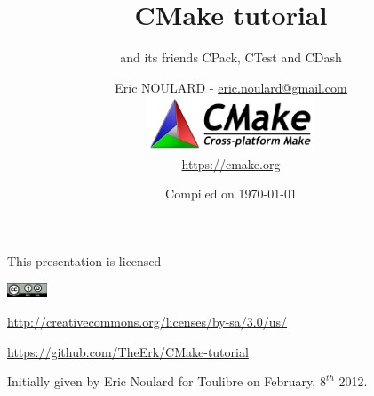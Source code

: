 \documentclass[compress,slidestop,table,usepdftitle=false
              ]
               {beamer}
\begin{document}


\title{CMake tutorial}
\subtitle{and its friends CPack, CTest and CDash}
\author[Eric NOULARD - \url{eric.noulard@gmail.com}]{Eric NOULARD - \url{eric.noulard@gmail.com}\\
        \includegraphics[width=5cm]{figures/CMake-logo-small}\\
        \url{https://cmake.org}}
\date{Compiled on \today}
\subject{Slides for CMake, CPack, CTest, CDash presentation. In english.}

\begin{frame}
\titlepage
\begin{center}
{\tiny
This presentation is licensed

\includegraphics[width=1.2cm]{figures/by-sa}

\url{http://creativecommons.org/licenses/by-sa/3.0/us/}

\url{https://github.com/TheErk/CMake-tutorial}

Initially given by Eric Noulard for Toulibre on February, $8^{th}$ 2012.
}
\end{center}
\end{frame}
\end{document}
